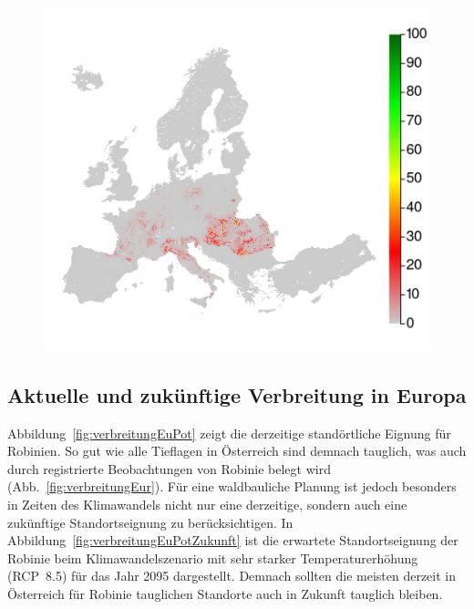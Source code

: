 \documentclass[twocolumn]{scrartcl}
\begin{document}
\begin{figure}[htbp]
  \centering
  \includegraphics[width=.9\linewidth]{./bild/verbreitungEuropa}
  \label{fig:verbreitungEuJetzt}
\end{figure}

\subsection{Aktuelle und zukünftige Verbreitung in Europa}

Abbildung~\ref{fig:verbreitungEuPot} zeigt die derzeitige standörtliche Eignung für Robinien. So gut wie alle Tieflagen in Österreich sind demnach tauglich, was auch durch registrierte Beobachtungen von Robinie belegt wird (Abb.~\ref{fig:verbreitungEur}). Für eine waldbauliche Planung ist jedoch besonders in Zeiten des Klimawandels nicht nur eine derzeitige, sondern auch eine zukünftige Standortseignung zu berücksichtigen. In Abbildung~\ref{fig:verbreitungEuPotZukunft} ist die erwartete Standortseignung der Robinie beim Klimawandelszenario mit sehr starker Temperaturerhöhung (RCP~8.5) für das Jahr 2095 dargestellt. Demnach sollten die meisten derzeit in Österreich für Robinie tauglichen Standorte auch in Zukunft tauglich bleiben.
\end{document}
